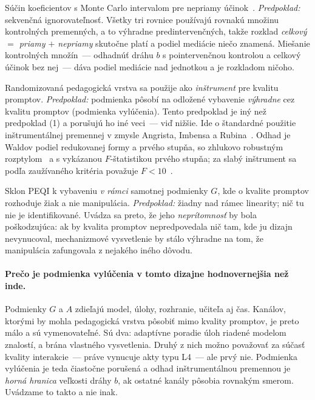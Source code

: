 \begin{description}[leftmargin=0.6cm, nosep]
    \item[\textbf{(1) Mediačný model.}] Súčin koeficientov s Monte Carlo intervalom pre nepriamy účinok~\cite{preacher2012montecarlo}. \emph{Predpoklad:} sekvenčná ignorovateľnosť. Všetky tri rovnice používajú rovnakú množinu kontrolných premenných, a to výhradne predintervenčných, takže rozklad \emph{celkový $=$ priamy $+$ nepriamy} skutočne platí a podiel mediácie niečo znamená. Miešanie kontrolných množín~--- odhadnúť dráhu $b$ s pointervenčnou kontrolou a celkový účinok bez nej~--- dáva podiel mediácie nad jednotkou a je rozkladom ničoho.
    \item[\textbf{(2) Inštrumentálna premenná.}] Randomizovaná pedagogická vrstva sa použije ako \emph{inštrument} pre kvalitu promptov. \emph{Predpoklad:} podmienka pôsobí na odložené vybavenie \emph{výhradne} cez kvalitu promptov (podmienka vylúčenia). Tento predpoklad je iný než predpoklad (1) a porušujú ho iné veci~--- viď nižšie. Ide o štandardné použitie inštrumentálnej premennej v zmysle Angrista, Imbensa a Rubina~\cite{angrist1996iv}. Odhad je Waldov podiel redukovanej formy a prvého stupňa, so zhlukovo robustným rozptylom~\cite{cameron2015cluster} a s vykázanou $F$-štatistikou prvého stupňa; za slabý inštrument sa podľa zaužívaného kritéria považuje $F<10$~\cite{staiger1997weak}.
    \item[\textbf{(3) Dávková závislosť.}] Sklon PEQI k vybaveniu \emph{v rámci} samotnej podmienky $G$, kde o kvalite promptov rozhoduje žiak a nie manipulácia. \emph{Predpoklad:} žiadny nad rámec linearity; nič tu nie je identifikované. Uvádza sa preto, že jeho \emph{neprítomnosť} by bola poškodzujúca: ak by kvalita promptov nepredpovedala nič tam, kde ju dizajn nevynucoval, mechanizmové vysvetlenie by stálo výhradne na tom, že manipulácia zafungovala z nejakého iného dôvodu.
\end{description}

\paragraph{Prečo je podmienka vylúčenia v tomto dizajne hodnovernejšia než inde.} Podmienky $G$ a $A$ zdieľajú model, úlohy, rozhranie, učiteľa aj čas. Kanálov, ktorými by mohla pedagogická vrstva pôsobiť mimo kvality promptov, je preto málo a sú vymenovateľné. Sú dva: adaptívne poradie úloh riadené modelom znalostí, a brána vlastného vysvetlenia. Druhý z nich možno považovať za súčasť kvality interakcie~--- práve vynucuje akty typu L4~--- ale prvý nie. Podmienka vylúčenia je teda čiastočne porušená a odhad inštrumentálnou premennou je \emph{horná hranica} veľkosti dráhy $b$, ak ostatné kanály pôsobia rovnakým smerom. Uvádzame to takto a nie inak.

